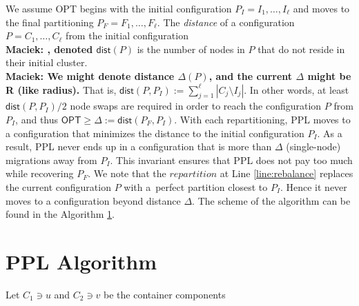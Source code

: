 \documentclass[manuscript,screen=true, review, anonymous]{acmart}
\newcommand{\OPT}{\textsf{OPT}\xspace}
\newcommand{\PPL}{\textsf{PPL}\xspace}
\newcommand{\dist}{\textsf{dist}}
\DeclarePairedDelimiter\set{\{}{\}}
\newcommand\maciek[1]{\color{brown}\textbf{\\ Maciek: #1}\color{black}}
\begin{document}
We assume \OPT begins with the initial configuration
$P_I = I_1, \dots, I_{\ell}$ and moves to the final partitioning
$P_F = F_1, \dots, F_{\ell}$.
 The \emph{distance} of a configuration $P = C_1, \dots, C_{\ell}$ from the initial configuration \maciek{, denoted $\dist(P)$} is the number of nodes in $P$ that do not reside in their initial cluster.
 \maciek{We might denote distance $\Delta(P)$, and the current $\Delta$ might be R (like radius).}
    That is,
    $\dist(P, P_I) := \sum_{j=1}^{\ell} | C_j \setminus I_j |$. 
In other words,
at least $\dist(P, P_I)/2$ node swaps are required in order to reach the configuration $P$ from $P_I$, and thus
$\OPT \geq \Delta:= \dist(P_F, P_I) $.
 With each repartitioning,
  \PPL moves to a configuration that minimizes the distance to the initial configuration $P_I$.
As a result,
\PPL never ends up in a configuration that is more than $\Delta$ (single-node) migrations away from $P_I$.
This invariant ensures that \PPL does not pay too much while recovering $P_F$.
      We note that the $\mathit{repartition}$ at Line \ref{line:rebalance} replaces the current configuration $P$ with a~perfect partition closest to $P_I$.
Hence it never moves to a configuration beyond distance $\Delta$.
The scheme of the algorithm can be found in the Algorithm \ref{alg:PPL}.

\section{PPL Algorithm} \label{alg:PPL}
\begin{algorithm}
	\renewcommand{\algorithmicrequire}{\textbf{Input:}}
	\renewcommand{\algorithmicensure}{\textbf{Output:}}
	\begin{algorithmic}
		\label{line:initcomponents}
		\STATE Let $C_1 \ni u$ and $C_2 \ni v$ be the container components
		 \label{line:mergecomponents}
		\label{line:rebalance} 
		\ENDIF
		\ENDIF
		\ENDFOR
	\end{algorithmic}
	\caption{Perfect Partition Learner (\PPL)}
	\label{alg:ppl}
\end{algorithm}
\end{document}
